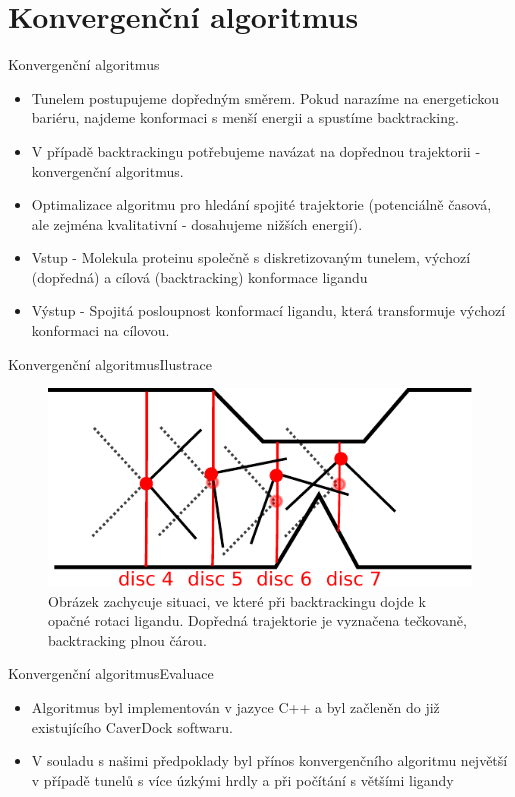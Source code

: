 \documentclass{beamer}
\begin{document}
\section{Konvergenční algoritmus}
\begin{frame}{Konvergenční algoritmus}
    \begin{itemize}
    \item Tunelem postupujeme dopředným směrem. Pokud narazíme na energetickou bariéru, najdeme konformaci s menší energii a spustíme backtracking.
	\item V případě backtrackingu potřebujeme navázat na dopřednou trajektorii - konvergenční algoritmus.
	\item Optimalizace algoritmu pro hledání spojité trajektorie (potenciálně časová, ale zejména kvalitativní - dosahujeme nižších energií).
	\item Vstup - Molekula proteinu společně s diskretizovaným tunelem, výchozí (dopředná) a cílová (backtracking) konformace ligandu
	\item Výstup - Spojitá posloupnost konformací ligandu, která transformuje výchozí konformaci na cílovou.
	\end{itemize}
\end{frame}

\begin{frame}{Konvergenční algoritmus}{Ilustrace}
    \begin{figure}
        \includegraphics[width=\textwidth]{img/backtracking_bad_rotation.pdf}
        \caption{Obrázek zachycuje situaci, ve které při backtrackingu dojde k opačné
rotaci ligandu.
Dopředná trajektorie je vyznačena tečkovaně, backtracking plnou čárou.
}
    \end{figure}
\end{frame}

\begin{frame}{Konvergenční algoritmus}{Evaluace}
    \begin{itemize}
	\item Algoritmus byl implementován v jazyce C++ a byl začleněn do již existujícího CaverDock softwaru.
	\item V souladu s našimi předpoklady byl přínos konvergenčního algoritmu největší v případě
tunelů s více úzkými hrdly a při počítání s většími ligandy
	\end{itemize}
\end{frame}
\end{document}
